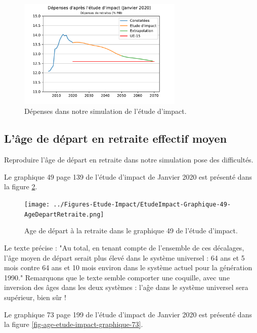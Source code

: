 \documentclass[10pt]{article}
\begin{document}
\begin{figure}
\begin{center}
\includegraphics[width=0.7\textwidth]{Simulation-Depenses.pdf}
\end{center}
\caption{Dépenses dans notre simulation de l'étude d'impact.}
\label{fig-dépenses-simulation}
\end{figure}


\subsection{L'âge de départ en retraite effectif moyen}

Reproduire l'âge de départ en retraite dans notre simulation 
pose des difficultés. 

Le graphique 49 page 139 de l'étude d'impact de Janvier 2020 est présenté 
dans la figure \ref{fig-age-etude-impact}.

\begin{figure}
\begin{center}
\texttt{[image: ../Figures-Etude-Impact/EtudeImpact-Graphique-49-AgeDepartRetraite.png]}
\end{center}
\caption{Age de départ à la retraite dans le graphique 49 de l'étude d'impact.}
\label{fig-age-etude-impact}
\end{figure}

Le texte précise : "Au total, en tenant compte de l’ensemble de ces 
décalages, l’âge moyen de départ serait plus élevé dans le système 
universel : 64 ans et 5 mois contre 64 ans et 10 mois environ dans 
le système actuel pour la génération 1990." 
Remarquons que le texte semble comporter une coquille, avec une inversion 
des âges dans les deux systèmes : l'aĝe dans le système universel sera supérieur, 
bien sûr ! 

Le graphique 73 page 199 de l'étude d'impact de Janvier 2020 est présenté 
dans la figure \ref{fig-age-etude-impact-graphique-73}.
\end{document}
